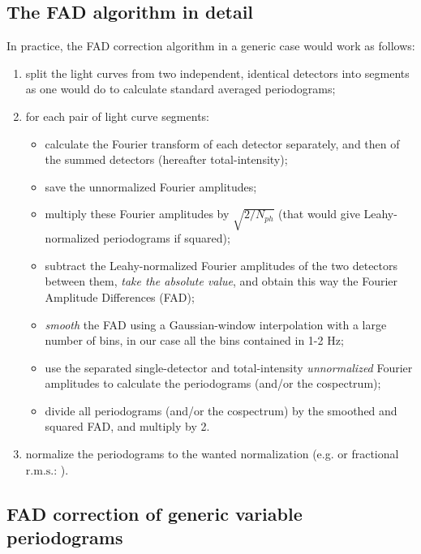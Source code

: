 \documentclass[twocolumn]{aastex61}
\newcommand{\rms}{\ensuremath{\mathrm{r.m.s.}}\xspace}
\begin{document}

\subsection{The FAD algorithm in detail} \label{sec:fad}
In practice, the FAD correction algorithm in a generic case would work as follows:
\begin{enumerate}
\item split the light curves from two independent, identical detectors into segments as one would do to calculate standard averaged periodograms;
\item for each pair of light curve segments: 
	\begin{itemize}
	\item calculate the Fourier transform of each detector separately, and then of the summed detectors (hereafter total-intensity); 
	\item save the unnormalized Fourier amplitudes;
	\item multiply these Fourier amplitudes by $\sqrt{2/N_{ph}}$ (that would give Leahy-normalized periodograms if squared);
	\item subtract the Leahy-normalized Fourier amplitudes of the two detectors between them, \textit{take the absolute value}, and obtain this way the Fourier Amplitude Differences (FAD);
	\item \textit{smooth} the FAD using a Gaussian-window interpolation with a large number of bins, in our case all the bins contained in 1-2 Hz;
	\item use the separated single-detector and total-intensity \textit{unnormalized} Fourier amplitudes to calculate the periodograms (and/or the cospectrum);
	\item divide all periodograms (and/or the cospectrum) by the smoothed and squared FAD, and multiply by 2.
	\end{itemize}
\item normalize the periodograms to the wanted normalization (e.g. \citealt{Leahy+83} or fractional \rms: \citealt{BelloniHasinger90,Miyamoto+91}).
\end{enumerate}

\subsection{FAD correction of generic variable periodograms} \label{sec:correction}
\end{document}
